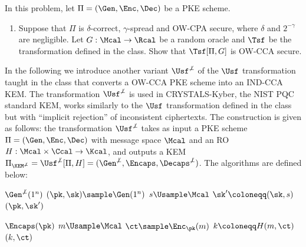 \begin{problem}\label{p2}
    \leavevmode\par
    In this problem, let $\Pi = (\Gen, \Enc, \Dec)$ be a PKE scheme.
    \begin{enumerate}[label=(\roman*)]
        \item Suppose that $\Pi$ is $\delta$-correct, $\gamma$-spread and OW-CPA secure, where $\delta$ and $2^{-\gamma}$ are negligible. Let $G:\Mcal\to \Rcal$ be a random oracle and $\Tsf$ be the transformation defined in the class. Show that $\Tsf[\Pi, G]$ is OW-CCA secure.
    \end{enumerate}
    
    In the following we introduce another variant $\Usf^{\not\bot}$ of the $\Usf$ transformation taught in the class that converts a OW-CCA PKE scheme into an IND-CCA KEM. The transformation $\Usf^{\not\bot}$ is used in CRYSTALS-Kyber, the NIST PQC standard KEM, works similarly to the $\Usf$ transformation defined in the class but with ``implicit rejection'' of inconsistent ciphertexts. The construction is given as follows: the transformation $\Usf^{\not\bot}$ takes as input a PKE scheme $\Pi = (\Gen, \Enc, \Dec)$ with message space $\Mcal$ and an RO $H: \Mcal\times \Ccal\to \Kcal$, and outputs a KEM $\Pi_{\KEM^{\not\bot}}=\Usf^{\not\bot}[\Pi, H]=(\Gen^{\not\bot}, \Encaps, \Decaps^{\not\bot})$. The algorithms are defined below:
    \begin{simplebox}
        \small
        \noindent
        \begin{minipage}[t]{0.32\textwidth}
            \begin{algorithmic}[1]
                \Statex \textbf{$\Gen^{\not\bot}(1^n)$}
                \Indent
                    \State $(\pk, \sk)\sample \Gen(1^n)$
                    \State $s\Usample\Mcal$
                    \State $\sk' \coloneqq (\sk, s)$
                    \State \Return $(\pk, \sk')$
                \EndIndent
            \end{algorithmic}
        \end{minipage}
        \hfill
        \begin{minipage}[t]{0.32\textwidth}
            \begin{algorithmic}[1]
                \Statex \textbf{$\Encaps(\pk)$}
                \Indent
                    \State $m\Usample \Mcal$
                    \State $\ct\sample \Enc_\pk(m)$
                    \State $k\coloneqq H(m,\ct)$
                    \State \Return $(k,\ct)$
                \EndIndent

\end{algorithmic}
\end{minipage}
\end{simplebox}
\end{problem}
